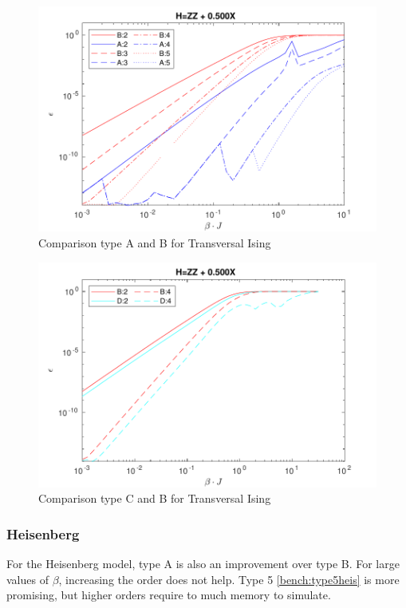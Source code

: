 \begin{figure}[H]
    \center
    \includegraphics[width=\textwidth]{Figuren/benchmarking/t_ising.pdf}
    \caption{Comparison type A and B for Transversal Ising}
    \label{fig:benchmark:tising}
\end{figure}

\begin{figure}[H]
    \center
    \includegraphics[width=\textwidth]{Figuren/benchmarking/type5/ising.pdf}
    \caption{Comparison type C and B for Transversal Ising}
    \label{bench:ising5}
\end{figure}

\subsubsection{Heisenberg}

For the Heisenberg model, type A is also an improvement over type B. For large values of $\beta$, increasing the order does not help. Type 5 \cref{bench:type5heis} is more promising, but higher orders require to much memory to simulate.

